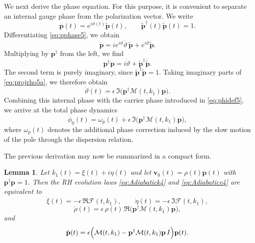 \documentclass[11pt]{amsart}
\newtheorem{lemma}{Lemma}[section]
\theoremstyle{definition}
\numberwithin{equation}{section}
\begin{document}
We next derive the phase equation. For this purpose, it is convenient to separate an internal gauge phase from the polarization vector. We write
\begin{equation}
\mathbf p(t)=e^{i\vartheta(t)}\widetilde{\mathbf p}(t),
\qquad
\widetilde{\mathbf p}^\dagger(t)\widetilde{\mathbf p}(t)=1.
\label{eq:pphase5}
\end{equation}
Differentiating \eqref{eq:pphase5}, we obtain
\[
\dot{\mathbf p}
=
ie^{i\vartheta}\dot\vartheta\,\widetilde{\mathbf p}
+
e^{i\vartheta}\dot{\widetilde{\mathbf p}}.
\]
Multiplying by $\mathbf p^\dagger$ from the left, we find
\[
\mathbf p^\dagger \dot{\mathbf p}
=
i\dot\vartheta
+
\widetilde{\mathbf p}^\dagger \dot{\widetilde{\mathbf p}}.
\]
The second term is purely imaginary, since $\widetilde{\mathbf p}^\dagger \widetilde{\mathbf p}=1$. Taking imaginary parts of \eqref{eq:projrho5a}, we therefore obtain
\begin{equation}
\dot{\vartheta}(t)=\epsilon\,\Im\bigl(\mathbf p^\dagger \mathcal M(t,k_1)\mathbf p\bigr).
\label{eq:varthetadot5}
\end{equation}
Combining this internal phase with the carrier phase introduced in \eqref{eq:phidef5}, we arrive at the total phase dynamics
\begin{equation}
\dot{\phi}_0(t)=\omega_p(t)+\epsilon\,\Im\bigl(\mathbf p^\dagger \mathcal M(t,k_1)\mathbf p\bigr),
\label{eq:phi0dot5}
\end{equation}
where $\omega_p(t)$ denotes the additional phase correction induced by the slow motion of the pole through the dispersion relation.

The previous derivation may now be summarized in a compact form.

\begin{lemma}
Let $k_1(t)=\xi(t)+i\eta(t)$ and let $\mathbf v_0(t)=\rho(t)\mathbf p(t)$ with $\mathbf p^\dagger\mathbf p=1$. Then the RH evolution laws \eqref{eq:Adiabatick4} and \eqref{eq:Adiabaticv4} are equivalent to
\begin{equation}
\dot{\xi}(t)=-\epsilon\,\Re \mathcal F(t,k_1),
\qquad
\dot{\eta}(t)=-\epsilon\,\Im \mathcal F(t,k_1),
\label{eq:lemmaxieta5}
\end{equation}
\begin{equation}
\dot{\rho}(t)=\epsilon\,\rho(t)\,\Re\bigl(\mathbf p^\dagger \mathcal M(t,k_1)\mathbf p\bigr),
\label{eq:lemmarho5}
\end{equation}
and
\begin{equation}
\dot{\mathbf p}(t)
=
\epsilon\Bigl(
\mathcal M(t,k_1)-\mathbf p^\dagger \mathcal M(t,k_1)\mathbf p\,I
\Bigr)\mathbf p(t).
\label{eq:lemmap5}
\end{equation}
\end{lemma}
\end{document}
